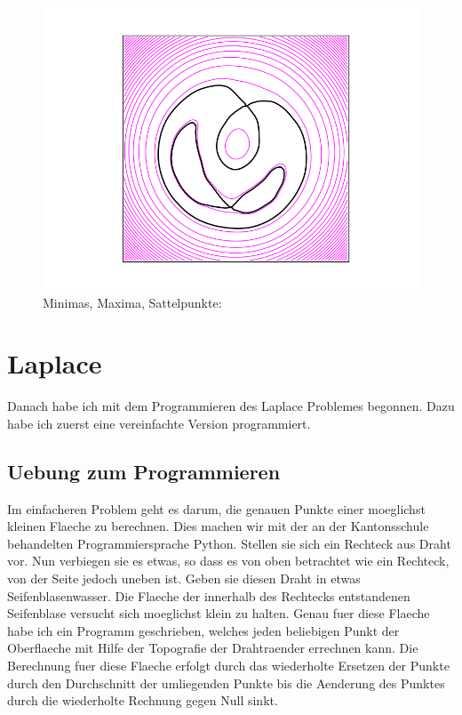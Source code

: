 \documentclass[pdftex,12pt,a4paper]{article}
\begin{document}
\begin{figure}[position=h]
\centering
 \caption{Minimas, Maxima, Sattelpunkte:}
 \includegraphics[width=12cm]{Bilder/workoutput1}%
\end{figure}

\newpage

\section {Laplace}

Danach habe ich mit dem Programmieren des Laplace Problemes begonnen.
Dazu habe ich zuerst eine vereinfachte Version programmiert.

\subsection {Uebung zum Programmieren}

Im einfacheren Problem geht es darum, die genauen Punkte einer moeglichst kleinen Flaeche zu berechnen.
Dies machen wir mit der an der Kantonsschule behandelten Programmiersprache Python.
Stellen sie sich ein Rechteck aus Draht vor.
Nun verbiegen sie es etwas, so dass es von oben betrachtet wie ein Rechteck,
von der Seite jedoch uneben ist.
Geben sie diesen Draht in etwas Seifenblasenwasser. 
Die Flaeche der innerhalb des Rechtecks entstandenen Seifenblase versucht sich moeglichst klein zu halten. 
Genau fuer diese Flaeche habe ich ein Programm geschrieben, welches jeden beliebigen Punkt der Oberflaeche mit Hilfe der Topografie der Drahtraender errechnen kann.
Die Berechnung fuer diese Flaeche erfolgt durch das wiederholte Ersetzen der Punkte durch den Durchschnitt der umliegenden Punkte bis die Aenderung des Punktes durch die wiederholte Rechnung gegen Null sinkt.
\end{document}
